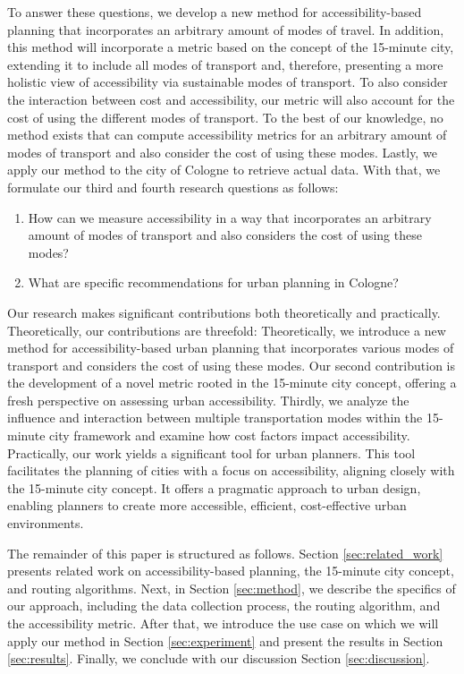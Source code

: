 To answer these questions, we develop a new method for accessibility-based planning that incorporates an arbitrary amount of modes of travel.
In addition, this method will incorporate a metric based on the concept of the 15-minute city, extending it to include all modes of transport and, therefore, presenting a more holistic view of accessibility via sustainable modes of transport.
To also consider the interaction between cost and accessibility, our metric will also account for the cost of using the different modes of transport.
To the best of our knowledge, no method exists that can compute accessibility metrics for an arbitrary amount of modes of transport and also consider the cost of using these modes.
Lastly, we apply our method to the city of Cologne to retrieve actual data.
With that, we formulate our third and fourth research questions as follows:

\begin{enumerate}
  \renewcommand{\labelenumi}{RQ \theenumi.}
  \setcounter{enumi}{2}
  \item How can we measure accessibility in a way that incorporates an arbitrary amount of modes of transport and also considers the cost of using these modes?
  \label{rq:measure_accessibility}
  \item What are specific recommendations for urban planning in Cologne?
  \label{rq:recommendations}
\end{enumerate}

Our research makes significant contributions both theoretically and practically. Theoretically, our contributions are threefold:
Theoretically, we introduce a new method for accessibility-based urban planning that incorporates various modes of transport and considers the cost of using these modes.
Our second contribution is the development of a novel metric rooted in the 15-minute city concept, offering a fresh perspective on assessing urban accessibility.
Thirdly, we analyze the influence and interaction between multiple transportation modes within the 15-minute city framework and examine how cost factors impact accessibility.
Practically, our work yields a significant tool for urban planners. 
This tool facilitates the planning of cities with a focus on accessibility, aligning closely with the 15-minute city concept. 
It offers a pragmatic approach to urban design, enabling planners to create more accessible, efficient, cost-effective urban environments.

The remainder of this paper is structured as follows.
Section \ref{sec:related_work} presents related work on accessibility-based planning, the 15-minute city concept, and routing algorithms.
Next, in Section \ref{sec:method}, we describe the specifics of our approach, including the data collection process, the routing algorithm, and the accessibility metric.
After that, we introduce the use case on which we will apply our method in Section \ref{sec:experiment} and present the results in Section \ref{sec:results}.
Finally, we conclude with our discussion Section \ref{sec:discussion}.

